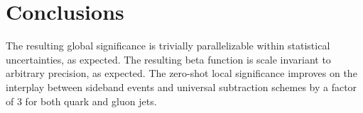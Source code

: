 \section{Conclusions}\label{sec:conclusions}

The resulting global significance is trivially parallelizable within
statistical uncertainties, as expected. The resulting beta function is
scale invariant to arbitrary precision, as expected. The zero-shot local
significance improves on the interplay between sideband events and
universal subtraction schemes by a factor of 3 for both quark and gluon
jets.

